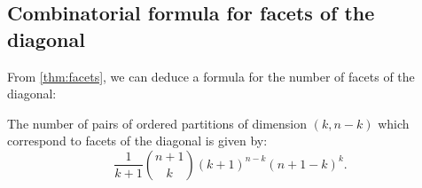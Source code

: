 

\subsection{Combinatorial formula for facets of the diagonal}

From \cref{thm:facets}, we can deduce a formula for the number of facets of the diagonal:

\begin{proposition}
The number of pairs of ordered partitions of dimension $(k,n-k)$ which correspond to facets of the diagonal is given by: 
\begin{equation}
\frac{1}{k+1}\binom{n+1}{k}(k+1)^{n-k}(n+1-k)^{k}.
\end{equation}
\end{proposition}

